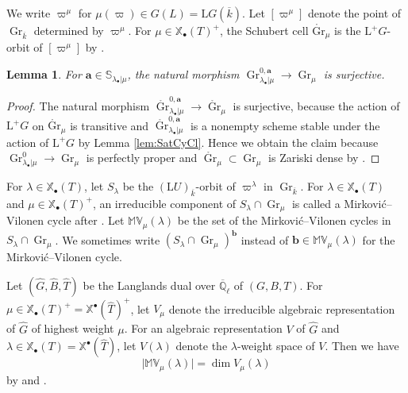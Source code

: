 \documentclass[12pt,a4paper]{article}
\newtheorem{lem}[thm]{Lemma}
\DeclareMathOperator{\Gr}{Gr}
\newcommand{\bQ}{\mathbb{Q}}
\newcommand{\bS}{\mathbb{S}}
\newcommand{\bX}{\mathbb{X}}
\newcommand{\bfa}{\mathbf{a}}
\newcommand{\bfb}{\mathbf{b}}
\newcommand{\rL}{\mathrm{L}}
\newcommand{\ol}{\overline}
\newcommand{\wh}{\widehat}
\newcommand{\bMV}{\mathbb{MV}}
\begin{document}
We write $\varpi^\mu$ for 
$\mu (\varpi) \in G(L)=\rL G (\ol{k})$. 
Let $[\varpi^{\mu}]$ denote the point of $\Gr_{\ol{k}}$ determined by $\varpi^{\mu}$. 
For $\mu \in \bX_{\bullet}( T)^+$, 
the Schubert cell $\mathring{\mathrm{Gr}}_{\mu}$ is the $\rL^+ G$-orbit of 
$[\varpi^{\mu}]$ by \cite[Proposition 1.23 (1)]{ZhuAffGmix}. 

\begin{lem}\label{lem:SatSurj}
For $\bfa \in \bS_{\lambda_\bullet | \mu}$, the natural morphism 
$\Gr^{0,\bfa}_{\lambda_\bullet | \mu} \to  
 \Gr_{\mu}$ is surjective. 
\end{lem}
\begin{proof}
The natural morphism 
$\mathring{\Gr}^{0,\bfa}_{\lambda_\bullet | \mu} \to  \mathring{\Gr}_{\mu}$ is surjective, 
because the action of $\rL^+ G$ on 
$\mathring{\mathrm{Gr}}_{\mu}$ is transitive and 
$\mathring{\Gr}^{0,\bfa}_{\lambda_\bullet | \mu}$ 
is a nonempty scheme stable under the action of 
$\rL^+ G$ by Lemma \ref{lem:SatCyCl}. 
Hence we obtain the claim 
because 
$\Gr^{0}_{\lambda_\bullet | \mu} \to  
 \Gr_{\mu}$ is perfectly proper and 
$\mathring{\Gr}_{\mu} \subset \Gr_{\mu}$ is Zariski dense by \cite[Proposition 1.23 (3)]{ZhuAffGmix}. 
\end{proof}



For $\lambda \in \bX_{\bullet}(T)$, 
let 
$S_{\lambda}$ 
be the 
$(\rL U)_{\ol{k}}$-orbit of $\varpi^{\lambda}$ in $\Gr_{\ol{k}}$. 
For $\lambda \in \bX_{\bullet}(T)$ and 
$\mu \in \bX_{\bullet}(T)^+$, 
an irreducible component of 
$S_{\lambda} \cap \Gr_{\mu}$ is called 
a Mirkovi\'{c}--Vilonen cycle after \cite{MiViGeoLd}. 
Let $\bMV_{\mu}(\lambda)$ be the 
set of the Mirkovi\'{c}--Vilonen cycles in 
$S_{\lambda} \cap \Gr_{\mu}$. 
We sometimes write 
$(S_{\lambda} \cap \Gr_{\mu})^{\bfb}$ 
instead of 
$\bfb \in \bMV_{\mu}(\lambda)$ 
for the Mirkovi\'{c}--Vilonen cycle. 

Let $(\wh{G},\wh{B},\wh{T})$ 
be the Langlands dual 
over $\ol{\bQ}_{\ell}$ of $(G,B,T)$. 
For $\mu \in \bX_{\bullet}(T)^+=\bX^{\bullet}(\wh{T})^+$, 
let $V_{\mu}$ denote the irreducible algebraic representation of 
$\wh{G}$ of highest weight $\mu$. 
For an algebraic representation $V$ of $\wh{G}$ 
and $\lambda \in \bX_{\bullet}(T)=\bX^{\bullet}(\wh{T})$, 
let $V(\lambda)$ denote the $\lambda$-weight space of $V$. 
Then we have 
\begin{equation}\label{eq:MVdim}
 \lvert \bMV_{\mu}(\lambda) \rvert = \dim V_{\mu} (\lambda) 
\end{equation}
by \cite[Proposition 5.4.2]{GHKRDimDL} and 
\cite[Corollary 2.8]{ZhuAffGmix}. 
\end{document}
